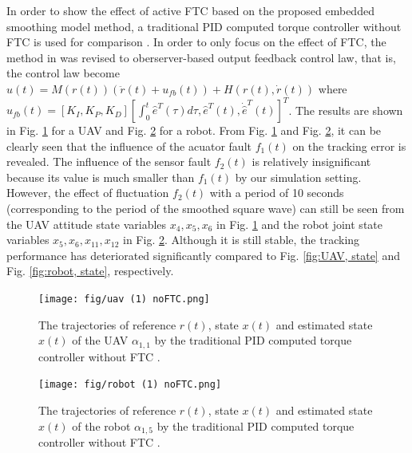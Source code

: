 \documentclass[journal,12pt,onecolumn,draftclsnofoot,]{IEEEtran}
\begin{document}
In order to show the effect of active FTC based on the proposed embedded smoothing model method, a traditional PID computed torque controller without FTC is used for comparison \cite{7456706}. In order to only focus on the effect of FTC, the method in \cite{7456706} was revised to oberserver-based output feedback control law, that is, the control law become $u(t)= M(r(t))(\ddot{r}(t) + u_{fb}(t)) + H(r(t),\dot{r}(t))$ where $u_{fb}(t) = [K_I, K_P, K_D][\int_{0}^{t}\hat{e}^T(\tau)d\tau, \hat{e}^T(t), \dot{\hat{e}}^T(t)]^T$. The results are shown in Fig. \ref{fig:uav, state, noFTC} for a UAV and Fig. \ref{fig:robot, state, noFTC} for a robot. From Fig. \ref{fig:uav, state, noFTC} and Fig. \ref{fig:robot, state, noFTC}, it can be clearly seen that the influence of the acuator fault $f_1(t)$ on the tracking error is revealed. The influence of the sensor fault $f_2(t)$ is relatively insignificant because its value is much smaller than $f_1(t)$ by our simulation setting. However, the effect of fluctuation $f_2(t)$ with a period of 10 seconds (corresponding to the period of the smoothed square wave) can still be seen from the UAV attitude state variables $x_4,x_5,x_6$ in Fig. \ref{fig:uav, state, noFTC} and the robot joint state variables $x_5,x_6,x_{11},x_{12}$ in Fig. \ref{fig:robot, state, noFTC}. Although it is still stable, the tracking performance has deteriorated significantly compared to Fig. \ref{fig:UAV, state} and Fig. \ref{fig:robot, state}, respectively.
\begin{figure}[htbp]
    \centering
    \texttt{[image: fig/uav (1) noFTC.png]}\caption{The trajectories of reference $r(t)$, state $x(t)$ and estimated state $\hat{x}(t)$ of the UAV $\alpha_{1,1}$ by the traditional PID computed torque controller without FTC \cite{7456706}.}%
    \label{fig:uav, state, noFTC}
\end{figure}
\begin{figure}[htbp]
    \centering
    \texttt{[image: fig/robot (1) noFTC.png]}\caption{The trajectories of reference $r(t)$, state $x(t)$ and estimated state $\hat{x}(t)$ of the robot $\alpha_{1,5}$ by the traditional PID computed torque controller without FTC \cite{7456706}.}%
    \label{fig:robot, state, noFTC}
\end{figure}
\end{document}
